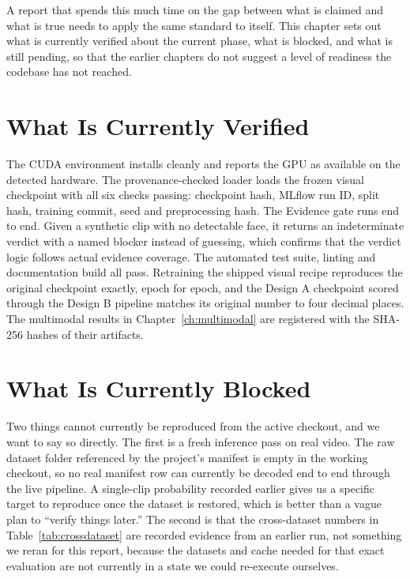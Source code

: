 A report that spends this much time on the gap between what is claimed and
what is true needs to apply the same standard to itself. This chapter sets out
what is currently verified about the current phase, what is blocked, and what
is still pending, so that the earlier chapters do not suggest a level of
readiness the codebase has not reached.

\section{What Is Currently Verified}

The CUDA environment installs cleanly and reports the GPU as available on the
detected hardware. The provenance-checked loader loads the frozen visual
checkpoint with all six checks passing: checkpoint hash, MLflow run ID, split
hash, training commit, seed and preprocessing hash. The Evidence gate runs end
to end. Given a synthetic clip with no detectable face, it returns an
indeterminate verdict with a named blocker instead of guessing, which confirms
that the verdict logic follows actual evidence coverage. The automated test
suite, linting and documentation build all pass. Retraining the shipped visual
recipe reproduces the original checkpoint exactly, epoch for epoch, and the
Design A checkpoint scored through the Design B pipeline matches its original
number to four decimal places. The multimodal results in
Chapter~\ref{ch:multimodal} are registered with the SHA-256 hashes of their
artifacts.

\section{What Is Currently Blocked}

Two things cannot currently be reproduced from the active checkout, and we
want to say so directly. The first is a fresh inference pass on real video. The
raw dataset folder referenced by the project's manifest is empty in the working
checkout, so no real manifest row can currently be decoded end to end through
the live pipeline. A single-clip probability recorded earlier gives us a
specific target to reproduce once the dataset is restored, which is better than
a vague plan to ``verify things later.'' The second is that the cross-dataset
numbers in Table~\ref{tab:crossdataset} are recorded evidence from an earlier
run, not something we reran for this report, because the datasets and cache
needed for that exact evaluation are not currently in a state we could
re-execute ourselves.

